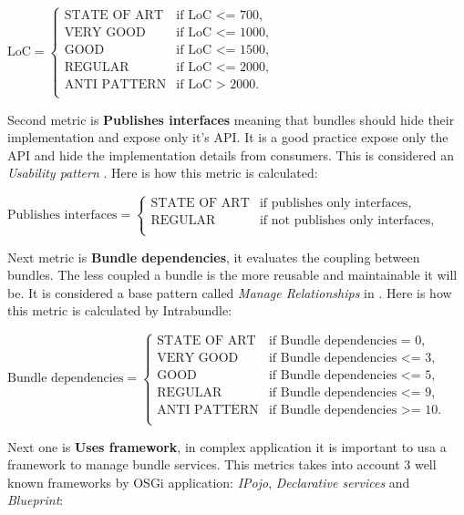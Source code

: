 \(\text{LoC}=\begin{cases}
\text{STATE OF ART}& \text{if LoC <= 700},\\
\text{VERY GOOD}& \text{if LoC <= 1000}, \\
\text{GOOD}& \text{if LoC <= 1500}, \\
\text{REGULAR}& \text{if LoC <= 2000}, \\
\text{ANTI PATTERN}& \text{if LoC > 2000}. \\
\end{cases} \)\newline  

Second metric is \textbf{Publishes interfaces} meaning that bundles should hide their implementation and expose only it's API. It is a good practice expose only the API and hide the implementation details from consumers. This is considered an \emph{Usability pattern} \citep{Knoernschild 2012}. Here is how this metric is calculated:\newline

\(\text{Publishes interfaces}=\begin{cases}
\text{STATE OF ART}& \text{if publishes only interfaces},\\
\text{REGULAR}& \text{if not publishes only interfaces}, \\
\end{cases} \)  \newline

Next metric is \textbf{Bundle dependencies}, it evaluates the coupling between bundles. The less coupled a bundle is the more reusable and maintainable it will be. It is considered a base pattern called \emph{Manage Relationships} in \citep{Knoernschild 2012}. Here is how this metric is calculated by Intrabundle:\newline


\(\text{Bundle dependencies}=\begin{cases}
\text{STATE OF ART}& \text{if Bundle dependencies = 0},\\
\text{VERY GOOD}& \text{if Bundle dependencies <= 3}, \\
\text{GOOD}& \text{if Bundle dependencies <= 5}, \\
\text{REGULAR}& \text{if Bundle dependencies <= 9}, \\
\text{ANTI PATTERN}& \text{if Bundle dependencies >= 10}. \\
\end{cases} \)\newline 

Next one is \textbf{Uses framework}, in complex application it is important to usa a framework to manage bundle services. This metrics takes into account 3 well known frameworks by OSGi application: \emph{IPojo}, \emph{Declarative services} and \emph{Blueprint}: \newline

